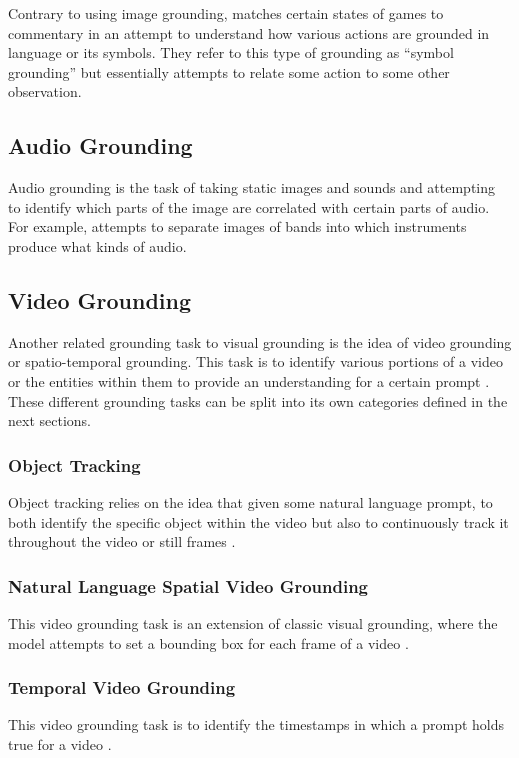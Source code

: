 \documentclass[11pt]{article}
\begin{document}
Contrary to using image grounding, \citet{kameko-etal-2015-symbol} matches certain states of games to commentary in an attempt to understand how various actions are grounded in language or its symbols. They refer to this type of grounding as ``symbol grounding'' but essentially attempts to relate some action to some other observation.

\subsection{Audio Grounding}
\label{sec:audio}
Audio grounding is the task of taking static images and sounds and attempting to identify which parts of the image are correlated with certain parts of audio. For example, \citet{Tian_2021_CVPR_cyclic_audio} attempts to separate images of bands into which instruments produce what kinds of audio.

\subsection{Video Grounding}
\label{sec:video}
Another related grounding task to visual grounding is the idea of video grounding or spatio-temporal grounding. This task is to identify various portions of a video or the entities within them to provide an understanding for a certain prompt \cite{Jiang_Cheng_Liu_Fang_Peng_Liu_2024_comprehensive_visual_grounding}. These different grounding tasks can be split into its own categories defined in the next sections.

\subsubsection{Object Tracking}
Object tracking relies on the idea that given some natural language prompt, to both identify the specific object within the video but also to continuously track it throughout the video or still frames \cite{Zhou_2023_CVPR_Tracking}.

\subsubsection{Natural Language Spatial Video Grounding}
This video grounding task is an extension of classic visual grounding, where the model attempts to set a bounding box for each frame of a video \cite{li-etal-2022-end-to-end-information-tree,ma2020learninggenerategroundedvisual}.

\subsubsection{Temporal Video Grounding}
This video grounding task is to identify the timestamps in which a prompt holds true for a video \cite{li-etal-2024-groundinggpt, NEURIPS2023_how_to_video,Bao_Zheng_Mu_2021_dense_events, chen-etal-2018-temporally}.
\end{document}
